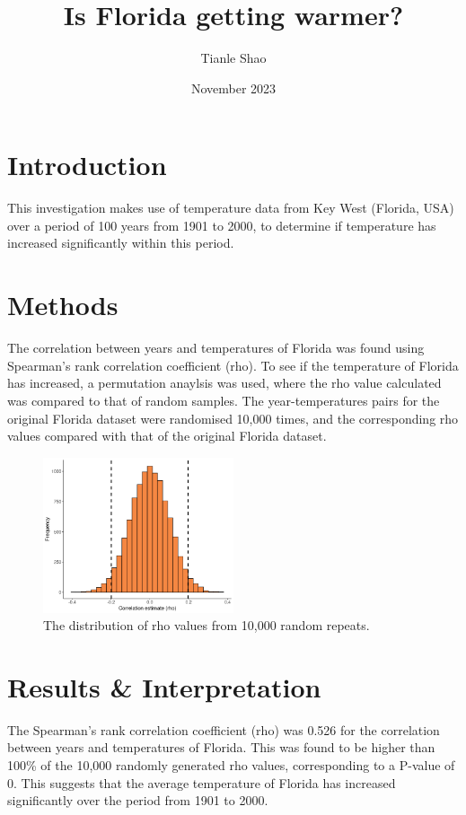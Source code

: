 \documentclass{article}
\title{\huge Is Florida getting warmer?}
\author{Tianle Shao}
\date{November 2023}
\begin{document}
\maketitle

\section{Introduction}

This investigation makes use of temperature data from Key West (Florida, USA) over a period of 100 years from 1901 to 2000, to determine if temperature has increased significantly within this period.

\section{Methods}

The correlation between years and temperatures of Florida was found using Spearman's rank correlation coefficient (rho). To see if the temperature of Florida has increased, a permutation anaylsis was used, where the rho value calculated was compared to that of random samples. The year-temperatures pairs for the original Florida dataset were randomised 10,000 times, and the corresponding rho values compared with that of the original Florida dataset.

\begin{figure}[h]
    \centering{}
    \includegraphics[width=0.5\textwidth]{Florida_Histogram.png}
    \caption{The distribution of rho values from 10,000 random repeats.}
    \label{fig:Histogram}
\end{figure}

\section{Results \& Interpretation}

The Spearman's rank correlation coefficient (rho) was 0.526 for the correlation between years and temperatures of Florida. This was found to be higher than 100\% of the 10,000 randomly generated rho values, corresponding to a P-value of 0. This suggests that the average temperature of Florida has increased significantly over the period from 1901 to 2000.
\end{document}
